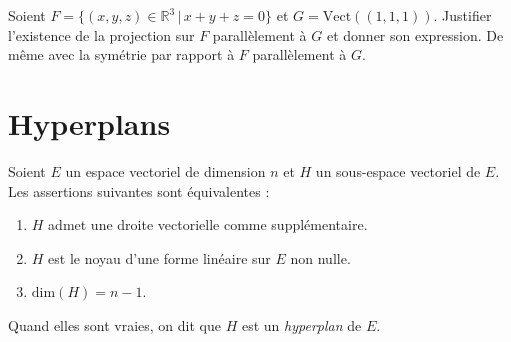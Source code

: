\documentclass[a4paper,10pt]{report}
\begin{document}
\begin{exa} Soient $F= \lbrace (x,y,z) \in \mathbb{R}^3 \, \vert \, x+y+z =0 \rbrace$ et $G= \textrm{Vect}((1,1,1))$. Justifier l'existence de la projection sur $F$ parallèlement à $G$ et donner son expression. De même avec la symétrie par rapport à $F$ parallèlement à $G$. \end{exa}

\section{Hyperplans}

\begin{thm} Soient $E$ un espace vectoriel de dimension $n$ et $H$ un sous-espace vectoriel de $E$. Les assertions suivantes sont équivalentes :

\begin{enumerate}
\item $H$ admet une droite vectorielle comme supplémentaire.
\item $H$ est le noyau d'une forme linéaire sur $E$ non nulle.
\item $\textrm{dim}(H)=n-1$.
\end{enumerate}
Quand elles sont vraies, on dit que $H$ est un \textit{hyperplan} de $E$.
\end{thm}
\end{document}
